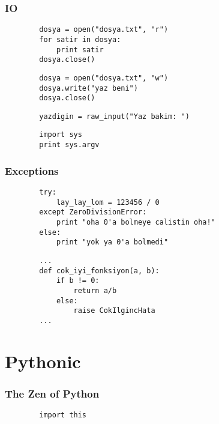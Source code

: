 \documentclass[10pt, compress]{beamer}
\begin{document}
\begin{frame}[fragile]
\frametitle{IO}    
    \begin{verbatim}
        dosya = open("dosya.txt", "r")
        for satir in dosya:
            print satir
        dosya.close()
    \end{verbatim}
    
    \begin{verbatim}
        dosya = open("dosya.txt", "w")
        dosya.write("yaz beni")
        dosya.close()
    \end{verbatim}   

    \begin{verbatim}
        yazdigin = raw_input("Yaz bakim: ")
    \end{verbatim}  

    \begin{verbatim}
        import sys
        print sys.argv
    \end{verbatim}       
\end{frame}

\begin{frame}[fragile]
\frametitle{Exceptions}    
    \begin{verbatim}
        try:
            lay_lay_lom = 123456 / 0
        except ZeroDivisionError:
            print "oha 0'a bolmeye calistin oha!"
        else:
            print "yok ya 0'a bolmedi"
    \end{verbatim}

    \begin{verbatim}
        ...
        def cok_iyi_fonksiyon(a, b):
            if b != 0:
                return a/b
            else:
                raise CokIlgincHata
        ...
    \end{verbatim}    
    
\end{frame}

\section{Pythonic}

\begin{frame}[fragile]
\frametitle{The Zen of Python}    
    \begin{verbatim}
        import this
    \end{verbatim}
\end{frame}
\end{document}
